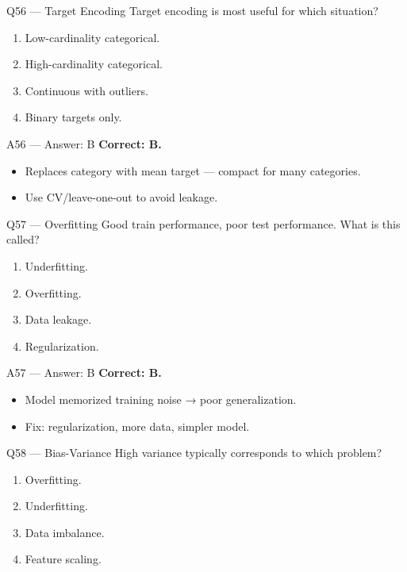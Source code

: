 \documentclass[aspectratio=169,10pt]{beamer}
\begin{document}
	\begin{frame}{Q56 — Target Encoding}
		Target encoding is most useful for which situation?
		\begin{enumerate}[label=\Alph*.]
			\item Low-cardinality categorical.
			\item High-cardinality categorical.
			\item Continuous with outliers.
			\item Binary targets only.
		\end{enumerate}
	\end{frame}
	
	\begin{frame}{A56 — Answer: B}
		\textbf{Correct: B.}
		\begin{itemize}
			\item Replaces category with mean target — compact for many categories.
			\item Use CV/leave-one-out to avoid leakage.
		\end{itemize}
	\end{frame}
	
	\begin{frame}{Q57 — Overfitting}
		Good train performance, poor test performance. What is this called?
		\begin{enumerate}[label=\Alph*.]
			\item Underfitting.
			\item Overfitting.
			\item Data leakage.
			\item Regularization.
		\end{enumerate}
	\end{frame}
	
	\begin{frame}{A57 — Answer: B}
		\textbf{Correct: B.}
		\begin{itemize}
			\item Model memorized training noise → poor generalization.
			\item Fix: regularization, more data, simpler model.
		\end{itemize}
	\end{frame}
	
	\begin{frame}{Q58 — Bias-Variance}
		High variance typically corresponds to which problem?
		\begin{enumerate}[label=\Alph*.]
			\item Overfitting.
			\item Underfitting.
			\item Data imbalance.
			\item Feature scaling.
		\end{enumerate}
	\end{frame}
	
\end{document}

